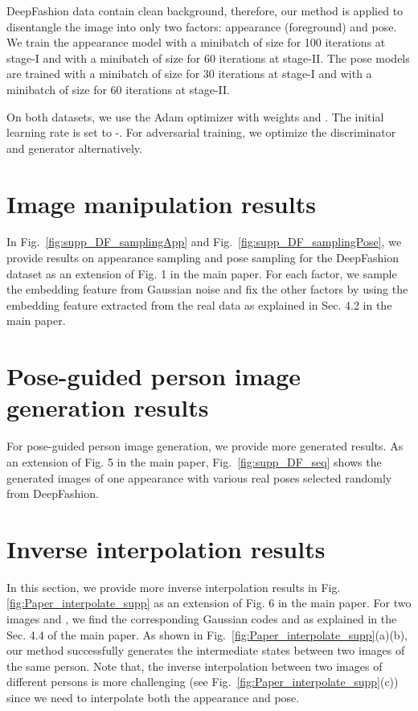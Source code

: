 \documentclass[10pt,twocolumn,letterpaper]{article}
\begin{document}
DeepFashion data contain clean background, therefore, our method is applied to disentangle the image into only two factors: appearance (\ie foreground) and pose.
We train the appearance model with a minibatch of size  for 100 iterations at stage-\RN{1} and with a minibatch of size  for 60  iterations at stage-\RN{2}. 
The pose models are trained with a minibatch of size  for 30  iterations at stage-\RN{1} and with a minibatch of size  for 60  iterations at stage-\RN{2}.

On both datasets, we use the Adam optimizer \cite{Adam} with weights  and . 
The initial learning rate is set to -. For adversarial training, we optimize the discriminator and generator alternatively.


\section{Image manipulation results}
\label{sec:supp_manipulation}

In Fig.~\ref{fig:supp_DF_samplingApp} and Fig.~\ref{fig:supp_DF_samplingPose}, we provide results on appearance sampling and pose sampling for the DeepFashion dataset as an extension of Fig. 1 in the main paper. For each factor, we sample the embedding feature from Gaussian noise and fix the other factors by using the embedding feature extracted from the real data as explained in Sec. 4.2 in the main paper.

\section{Pose-guided person image generation results}
\label{sec:supp_PG2}
For pose-guided person image generation, we provide more generated results. As an extension of Fig. 5 in the main paper, Fig.~\ref{fig:supp_DF_seq} shows the generated images of one appearance with various real poses selected randomly from DeepFashion. 

\section{Inverse interpolation results}
\label{sec:supp_interpolation}

In this section, we provide more inverse interpolation results in Fig.\ref{fig:Paper_interpolate_supp} as an extension of Fig. 6 in the main paper. 
For two images  and , we find the corresponding Gaussian codes  and  as explained in the Sec. 4.4 of the main paper.
As shown in Fig.~\ref{fig:Paper_interpolate_supp}(a)(b), our method successfully generates the intermediate states between two images of the same person.
Note that, the inverse interpolation between two images of different persons is more challenging (see Fig.~\ref{fig:Paper_interpolate_supp}(c)) since we need to interpolate both the appearance and pose.
\end{document}

